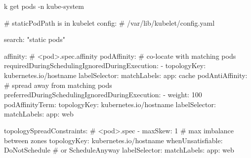 \begin{tcbitemize}[
  raster columns=4, raster equal height=rows,
  blanker, cheat subtitle
]
\begin{tcbitemize}[
      raster columns=1, raster equal height=rows,
      blanker, cheat subtitle
    ]
        \begin{cheatcodebashbold}
        k get pods -n kube-system
        \end{cheatcodebashbold}

        \begin{cheatcodebash}
        # staticPodPath is in kubelet config:
        # /var/lib/kubelet/config.yaml
        \end{cheatcodebash}

        \begin{cheatcodebash}
        search: "static pods"
        \end{cheatcodebash}

    \end{tcbitemize}

  \tcbitem
    \begin{tcbitemize}[
      raster columns=1, raster equal height=rows,
      blanker, cheat subtitle
    ]

      \tcbitem


        \begin{cheatcodebash}
        affinity:              # <pod>.spec.affinity
          podAffinity:          # co-locate with matching pods
            requiredDuringSchedulingIgnoredDuringExecution:
            - topologyKey: kubernetes.io/hostname
              labelSelector:
                matchLabels: {app: cache}
          podAntiAffinity:      # spread away from matching pods
            preferredDuringSchedulingIgnoredDuringExecution:
            - weight: 100
              podAffinityTerm:
                topologyKey: kubernetes.io/hostname
                labelSelector:
                  matchLabels: {app: web}
        \end{cheatcodebash}

        \begin{cheatcodebash}
        topologySpreadConstraints:   # <pod>.spec
        - maxSkew: 1                 # max imbalance between zones
          topologyKey: kubernetes.io/hostname
          whenUnsatisfiable: DoNotSchedule  # or ScheduleAnyway
          labelSelector:
            matchLabels: {app: web}
        \end{cheatcodebash}


\end{tcbitemize}
\end{tcbitemize}
